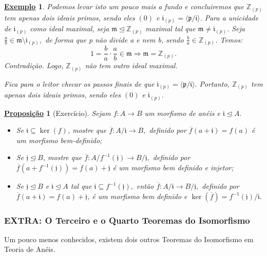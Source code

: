 \documentclass{article}
\newtheorem*{prop*}{\underline{Proposi\c c\~ao}}
\newtheorem{example}{\underline{Exemplo}}
\begin{document}
\begin{example}
      Podemos levar isto um pouco mais a fundo e concluiremos que \(\mathbb{Z}_{(p)}\) tem apenas dois ideais primos, sendo eles \((0)\) e \(\mathfrak{i}_{(p)}=\langle \mathfrak{p}/\mathfrak{i} \rangle.\)
      Para a unicidade de \(\mathfrak{i}_{(p)}\) como ideal maximal, seja \(\mathfrak{m}\trianglelefteq \mathbb{Z}_{(p)}\) maximal tal que \(\mathfrak{m}\neq \mathfrak{i}_{(p)}\). Seja 
      \(\frac{a}{b}\in \mathfrak{m}\setminus{\mathfrak{i}_{(p)}},\) de forma que p não divide a e nem b, sendo \(\frac{b}{a}\in \mathbb{Z}_{(p)}\). Temos:
      \[
        1 = \frac{b}{a}\cdot \frac{a}{b}\in \mathfrak{m}\Rightarrow \mathfrak{m}=\mathbb{Z}_{(p)}.
      \]
      Contradição. Logo, \(\mathbb{Z}_{(p)}\) não tem outro ideal maximal. 

      Fica para o leitor checar os passos finais de que \(\mathfrak{i}_{(p)} = \langle \mathfrak{p}/\mathfrak{i} \rangle.\) Portanto, \(\mathbb{Z}_{(p)}\) tem apenas
      dois ideais primos, sendo eles \((0)\) e \(\mathfrak{i}_{(p)}.\)
    \end{example}
    \begin{prop*}[Exercício]
      Sejam \(f:A\rightarrow B\) um morfismo de anéis e \(\mathfrak{i}\trianglelefteq{A}.\)
      \begin{itemize}
        \item[1)] Se \(\mathfrak{i}\subseteq \ker{(f)}\), mostre que \(\overline{f}:A/\mathfrak{i}\rightarrow B,\) definido por \(\overline{f}(a+\mathfrak{i}) = f(a)\) é 
          um morfismo bem-definido;
        \item[2)] Se \(\mathfrak{j}\trianglelefteq{B}\), mostre que \(\overline{f}:A/f^{-1}(\mathfrak{j})\rightarrow B/\mathfrak{j},\) definido por
          \(\overline{f}(a+f^{-1}(\mathfrak{j})) = f(a) + \mathfrak{j}\) é um morfismo bem definido e injetor;
        \item[3)] Se \(\mathfrak{j}\trianglelefteq{B}\) e \(\mathfrak{i}\trianglelefteq{A}\) tal que \(\mathfrak{i}\subseteq f^{-1}(\mathfrak{j}),\) então
          \(\overline{f}:A/\mathfrak{i}\rightarrow B/\mathfrak{j}, \) definido por \(\overline{f}(a+\mathfrak{i})=f(a)+\mathfrak{j}\),
          é um morfismo bem definido e \(\ker{(\overline{f})} = f^{-1}(\mathfrak{j})/\mathfrak{i}.\)
      \end{itemize}
    \end{prop*}
    \subsubsection{EXTRA: O Terceiro e o Quarto Teoremas do Isomorfismo}
    Um pouco menos conhecidos, existem dois outros Teoremas do Isomorfismo em Teoria de Anéis. 
\end{document}
